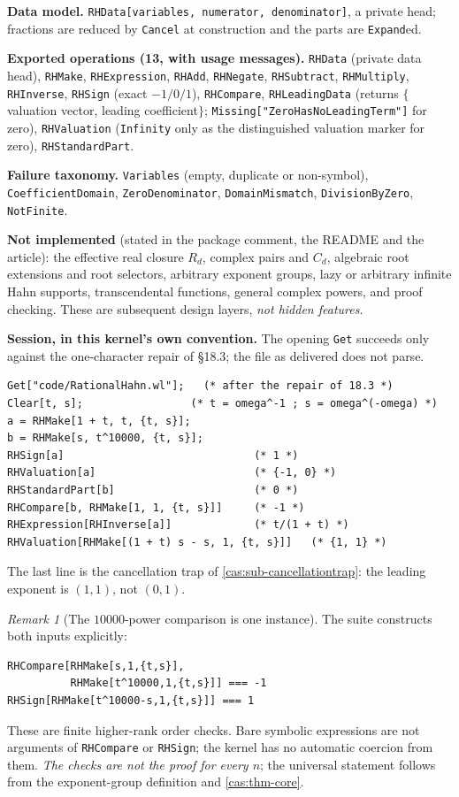 \documentclass[11pt,letterpaper]{article}
\numberwithin{equation}{section}
\theoremstyle{definition}
\theoremstyle{remark}
\newtheorem{remark}[theorem]{Remark}
\begin{document}
\textbf{Data model.} \texttt{RHData[variables, numerator, denominator]}, a
private head; fractions are reduced by \texttt{Cancel} at construction and the
parts are \texttt{Expand}ed.

\textbf{Exported operations (13, with usage messages).} \texttt{RHData} (private
data head), \texttt{RHMake}, \texttt{RHExpression}, \texttt{RHAdd},
\texttt{RHNegate}, \texttt{RHSubtract}, \texttt{RHMultiply},
\texttt{RHInverse}, \texttt{RHSign} (exact $-1/0/1$), \texttt{RHCompare},
\texttt{RHLeadingData} (returns $\{$valuation vector, leading coefficient$\}$;
\texttt{Missing["ZeroHasNoLeadingTerm"]} for zero), \texttt{RHValuation}
(\texttt{Infinity} only as the distinguished valuation marker for zero),
\texttt{RHStandardPart}.

\textbf{Failure taxonomy.} \texttt{Variables} (empty, duplicate or non-symbol),
\texttt{CoefficientDomain}, \texttt{ZeroDenominator}, \texttt{DomainMismatch},
\texttt{DivisionByZero}, \texttt{NotFinite}.

\textbf{Not implemented} (stated in the package comment, the README and the
article): the effective real closure $R_d$, complex pairs and $C_d$, algebraic
root extensions and root selectors, arbitrary exponent groups, lazy or arbitrary
infinite Hahn supports, transcendental functions, general complex powers, and
proof checking. These are subsequent design layers, \emph{not hidden features}.

\textbf{Session, in this kernel's own convention.} The opening
\texttt{Get} succeeds only against the one-character repair of \S18.3; the
file as delivered does not parse.
\begin{lstlisting}
Get["code/RationalHahn.wl"];   (* after the repair of 18.3 *)
Clear[t, s];                 (* t = omega^-1 ; s = omega^(-omega) *)
a = RHMake[1 + t, t, {t, s}];
b = RHMake[s, t^10000, {t, s}];
RHSign[a]                              (* 1 *)
RHValuation[a]                         (* {-1, 0} *)
RHStandardPart[b]                      (* 0 *)
RHCompare[b, RHMake[1, 1, {t, s}]]     (* -1 *)
RHExpression[RHInverse[a]]             (* t/(1 + t) *)
RHValuation[RHMake[(1 + t) s - s, 1, {t, s}]]   (* {1, 1} *)
\end{lstlisting}
The last line is the cancellation trap of \cref{cas:sub-cancellationtrap}: the
leading exponent is $(1,1)$, not $(0,1)$.

\begin{remark}[The $10000$-power comparison is one instance]
\label{cas:rem-10000}
The suite constructs both inputs explicitly:
\begin{lstlisting}
RHCompare[RHMake[s,1,{t,s}],
          RHMake[t^10000,1,{t,s}]] === -1
RHSign[RHMake[t^10000-s,1,{t,s}]] === 1
\end{lstlisting}
These are finite higher-rank order checks. Bare symbolic expressions are not
arguments of \texttt{RHCompare} or \texttt{RHSign}; the kernel has no automatic
coercion from them. \emph{The checks are not the proof for every $n$}; the universal statement
follows from the exponent-group definition and \cref{cas:thm-core}.
\end{remark}
\end{document}
